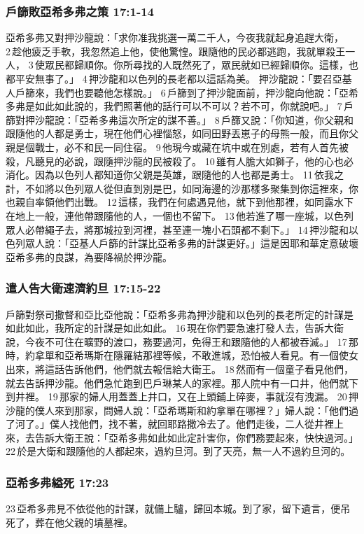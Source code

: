 \subsubsection{戶篩敗亞希多弗之策 17:1-14}
亞希多弗又對押沙龍說：「求你准我挑選一萬二千人，今夜我就起身追趕大衛， 2 趁他疲乏手軟，我忽然追上他，使他驚惶。跟隨他的民必都逃跑，我就單殺王一人， 3 使眾民都歸順你。你所尋找的人既然死了，眾民就如已經歸順你。這樣，也都平安無事了。」 4 押沙龍和以色列的長老都以這話為美。
押沙龍說：「要召亞基人戶篩來，我們也要聽他怎樣說。」 6 戶篩到了押沙龍面前，押沙龍向他說：「亞希多弗是如此如此說的，我們照著他的話行可以不可以？若不可，你就說吧。」 7 戶篩對押沙龍說：「亞希多弗這次所定的謀不善。」 8 戶篩又說：「你知道，你父親和跟隨他的人都是勇士，現在他們心裡惱怒，如同田野丟崽子的母熊一般，而且你父親是個戰士，必不和民一同住宿。 9 他現今或藏在坑中或在別處，若有人首先被殺，凡聽見的必說，跟隨押沙龍的民被殺了。 10 雖有人膽大如獅子，他的心也必消化。因為以色列人都知道你父親是英雄，跟隨他的人也都是勇士。 11 依我之計，不如將以色列眾人從但直到別是巴，如同海邊的沙那樣多聚集到你這裡來，你也親自率領他們出戰。 12 這樣，我們在何處遇見他，就下到他那裡，如同露水下在地上一般，連他帶跟隨他的人，一個也不留下。 13 他若進了哪一座城，以色列眾人必帶繩子去，將那城拉到河裡，甚至連一塊小石頭都不剩下。」 14 押沙龍和以色列眾人說：「亞基人戶篩的計謀比亞希多弗的計謀更好。」這是因耶和華定意破壞亞希多弗的良謀，為要降禍於押沙龍。

\subsubsection{遣人告大衛速濟約旦 17:15-22}
戶篩對祭司撒督和亞比亞他說：「亞希多弗為押沙龍和以色列的長老所定的計謀是如此如此，我所定的計謀是如此如此。 16 現在你們要急速打發人去，告訴大衛說，今夜不可住在曠野的渡口，務要過河，免得王和跟隨他的人都被吞滅。」 17 那時，約拿單和亞希瑪斯在隱羅結那裡等候，不敢進城，恐怕被人看見。有一個使女出來，將這話告訴他們，他們就去報信給大衛王。 18 然而有一個童子看見他們，就去告訴押沙龍。他們急忙跑到巴戶琳某人的家裡。那人院中有一口井，他們就下到井裡。 19 那家的婦人用蓋蓋上井口，又在上頭鋪上碎麥，事就沒有洩漏。 20 押沙龍的僕人來到那家，問婦人說：「亞希瑪斯和約拿單在哪裡？」婦人說：「他們過了河了。」僕人找他們，找不著，就回耶路撒冷去了。他們走後，二人從井裡上來，去告訴大衛王說：「亞希多弗如此如此定計害你，你們務要起來，快快過河。」 22 於是大衛和跟隨他的人都起來，過約旦河。到了天亮，無一人不過約旦河的。

\subsubsection{亞希多弗縊死 17:23}
 23 亞希多弗見不依從他的計謀，就備上驢，歸回本城。到了家，留下遺言，便吊死了，葬在他父親的墳墓裡。

